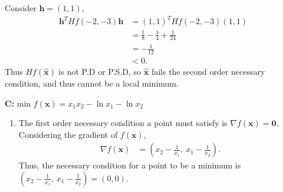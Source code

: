 \documentclass[a4paper,11pt]{article}
\newcommand{\ds}{\displaystyle}
\begin{document}
{{\begin{enumerate}[leftmargin=*]
\begin{enumerate}[label=\alph*)]
				Consider $\ds{\mathbf{h} = (1,1)}$, 
				\begin{align*}
					\mathbf{h}^T Hf(-2,-3)\mathbf{h} & = (1,1)^T Hf(-2,-3) (1,1)\\
													 & = \frac{1}{8} - \frac{1}{4} + \frac{1}{24} \\
													 & = -\frac{1}{12}\\
													 & < 0.
				\end{align*}
				Thus $\ds{Hf(\hat{\mathbf{x}})}$ is not P.D or P.S.D, so $\ds{\hat{\mathbf{x}}}$ fails the second order necessary condition, and thus cannot be a local minimum. 

			\end{enumerate}
			\textbf{C:} min $\ds{f(\mathbf{x}) = x_1x_2 - \ln{x_1} - \ln{x_2}}$
			\begin{enumerate}[label=\alph*)]

				\item The first order necessary condition a point must satisfy is $\ds{\nabla f(\mathbf{x}) = \mathbf{0}}$. Considering the gradient of $\ds{f(\mathbf{x})}$,
					\begin{align*}
						\nabla f(\mathbf{x}) & = \left(x_2-\frac{1}{x_1}, \: x_1-\frac{1}{x_2}\right). 
					\end{align*}
					Thus, the necessary condition for a point to be a minimum is $\ds{\left(x_2-\frac{1}{x_1}, \: x_1-\frac{1}{x_2}\right) = (0,0)}$.


\end{enumerate}
\end{enumerate}}}
\end{document}
